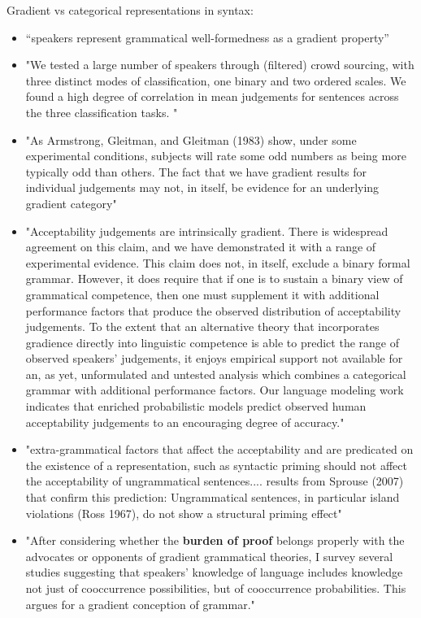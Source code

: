 \documentclass[11pt,fleqn]{article}
\newcommand{\6}{\mbox{$[\hspace*{-.6mm}[$}}
\newcommand{\9}{\mbox{$]\hspace*{-.6mm}]$}}
\begin{document}
Gradient vs categorical representations in syntax:
\begin{itemize}
	\item ``speakers represent grammatical well-formedness as a gradient property'' \cite{lau2014}
	\item "We tested a large number of speakers through (filtered) crowd sourcing, with three distinct modes of classification, one binary and
two ordered scales. We found a high degree of correlation in mean judgements for sentences across the three classification tasks. " \cite{lau2014}
	\item "As Armstrong, Gleitman, and Gleitman (1983)
show, under some experimental conditions, subjects will rate some odd numbers as being more typically odd than others.
The fact that we have gradient results for individual judgements may not, in itself, be evidence for an underlying gradient category" \cite{lau2014}
	\item "Acceptability judgements are intrinsically gradient. There is widespread agreement on this claim, and we have demonstrated it with a range of experimental evidence. This claim does not, in itself, exclude a binary formal grammar. However, it does require that if one is to sustain a binary view of grammatical competence, then one must supplement it with additional performance factors that produce the observed distribution of acceptability judgements. To the extent that an alternative theory that incorporates gradience directly into linguistic competence is able to predict the range of observed speakers' judgements, it enjoys empirical support not available for an, as yet, unformulated and untested analysis which combines a categorical grammar with additional performance factors. Our language modeling work indicates that enriched probabilistic models predict observed human acceptability judgements to an encouraging degree of accuracy." \cite{lau2017}
	\item "extra-grammatical factors that
affect the acceptability and are predicated on the existence of a representation, such as syntactic priming should not affect the acceptability of ungrammatical sentences.... results from Sprouse (2007) that confirm this prediction: Ungrammatical sentences, in particular island
violations (Ross 1967), do not show a structural priming effect" \cite{sprouse2007}
	\item "After considering whether the \textbf{burden of proof} belongs properly with the advocates or opponents of gradient grammatical theories, I survey several studies suggesting that speakers' knowledge of language includes knowledge not just of cooccurrence possibilities, but of cooccurrence probabilities. This argues for a gradient conception of grammar." \cite{wasow2007}

\end{itemize}
\end{document}
